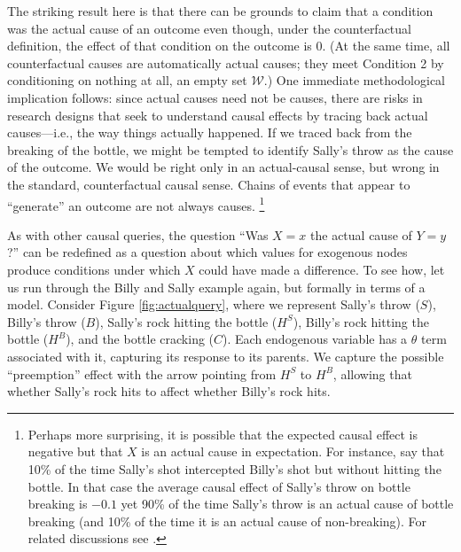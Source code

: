 \documentclass[12pt,]{book}
\let\rmarkdownfootnote\footnote%
\def\footnote{\protect\rmarkdownfootnote}
\begin{document}
The striking result here is that there can be grounds to claim that a condition was the actual cause of an outcome even though, under the counterfactual definition, the effect of that condition on the outcome is 0. (At the same time, all counterfactual causes are automatically actual causes; they meet Condition 2 by conditioning on nothing at all, an empty set \(\mathcal W\).) One immediate methodological implication follows: since actual causes need not be causes, there are risks in research designs that seek to understand causal effects by tracing back actual causes---i.e., the way things actually happened. If we traced back from the breaking of the bottle, we might be tempted to identify Sally's throw as the cause of the outcome. We would be right only in an actual-causal sense, but wrong in the standard, counterfactual causal sense. Chains of events that appear to ``generate'' an outcome are not always causes. \footnote{Perhaps more surprising, it is possible that the expected causal effect is negative but that \(X\) is an actual cause in expectation. For instance, say that 10\% of the time Sally's shot intercepted Billy's shot but without hitting the bottle. In that case the average causal effect of Sally's throw on bottle breaking is \(-0.1\) yet 90\% of the time Sally's throw is an actual cause of bottle breaking (and 10\% of the time it is an actual cause of non-breaking). For related discussions see \citet{menzies1989probabilistic}.}

As with other causal queries, the question ``Was \(X=x\) the actual cause of \(Y=y\)?'' can be redefined as a question about which values for exogenous nodes produce conditions under which \(X\) could have made a difference. To see how, let us run through the Billy and Sally example again, but formally in terms of a model. Consider Figure \ref{fig:actualquery}, where we represent Sally's throw (\(S\)), Billy's throw (\(B\)), Sally's rock hitting the bottle (\(H^S\)), Billy's rock hitting the bottle (\(H^B\)), and the bottle cracking (\(C\)). Each endogenous variable has a \(\theta\) term associated with it, capturing its response to its parents. We capture the possible ``preemption'' effect with the arrow pointing from \(H^S\) to \(H^B\), allowing that whether Sally's rock hits to affect whether Billy's rock hits.
\end{document}
